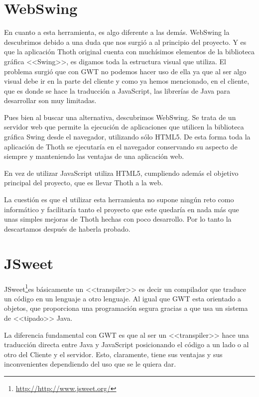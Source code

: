 \section{WebSwing}

En cuanto a esta herramienta, es algo diferente a las demás. WebSwing la descubrimos debido a una duda que nos surgió a al principio del proyecto. Y es que la aplicación Thoth original cuenta con muchísimos elementos de la biblioteca gráfica <<Swing>>, es digamos toda la estructura visual que utiliza. El problema surgió que con GWT no podemos hacer uso de ella ya que al ser algo visual debe ir en la parte del cliente y como ya hemos mencionado, en el cliente, que es donde se hace la traducción a JavaScript, las librerías de Java para desarrollar son muy limitadas. 

Pues bien al buscar una alternativa, descubrimos WebSwing. Se trata de un servidor web que permite la ejecución de aplicaciones que utilicen la biblioteca gráfica Swing desde el navegador, utilizando sólo HTML5. De esta forma toda la aplicación de Thoth se ejecutaría en el navegador conservando su aspecto de siempre y manteniendo las ventajas de una aplicación web.

En vez de utilizar JavaScript utiliza HTML5, cumpliendo además el objetivo principal del proyecto, que es llevar Thoth a la web.

La cuestión es que el utilizar esta herramienta no supone ningún reto como informático y facilitaría tanto el proyecto que este quedaría en nada más que unas simples mejoras de Thoth hechas con poco desarrollo. Por lo tanto la descartamos después de haberla probado.

\section{JSweet} 

JSweet\footnote{\url{http://http://www.jsweet.org/}}es básicamente un <<transpiler>> es decir un compilador que traduce un código en un lenguaje a otro lenguaje. Al igual que GWT esta orientado a objetos, que proporciona una programación segura gracias a que usa un sistema de <<tipado>> Java.

La diferencia fundamental con GWT es que al ser un <<transpiler>> hace una traducción directa entre Java y JavaScript posicionando el código a un lado o al otro del Cliente y el servidor. Esto, claramente, tiene sus ventajas y sus inconvenientes dependiendo del uso que se le quiera dar. 


